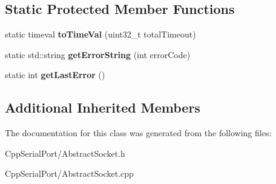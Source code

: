 \subsection*{Static Protected Member Functions}
\begin{DoxyCompactItemize}
\item 
\mbox{\label{class_cpp_serial_port_1_1_abstract_socket_a077628ef2ab2622d275b79f8ecaba765}} 
static timeval {\bfseries to\+Time\+Val} (uint32\+\_\+t total\+Timeout)
\item 
\mbox{\label{class_cpp_serial_port_1_1_abstract_socket_a9233ef47772d6c091eb6951b86006f0d}} 
static std\+::string {\bfseries get\+Error\+String} (int error\+Code)
\item 
\mbox{\label{class_cpp_serial_port_1_1_abstract_socket_a33c329aa73c8358c184c188dd80ddc6e}} 
static int {\bfseries get\+Last\+Error} ()
\end{DoxyCompactItemize}
\subsection*{Additional Inherited Members}


The documentation for this class was generated from the following files\+:\begin{DoxyCompactItemize}
\item 
Cpp\+Serial\+Port/Abstract\+Socket.\+h\item 
Cpp\+Serial\+Port/Abstract\+Socket.\+cpp\end{DoxyCompactItemize}
